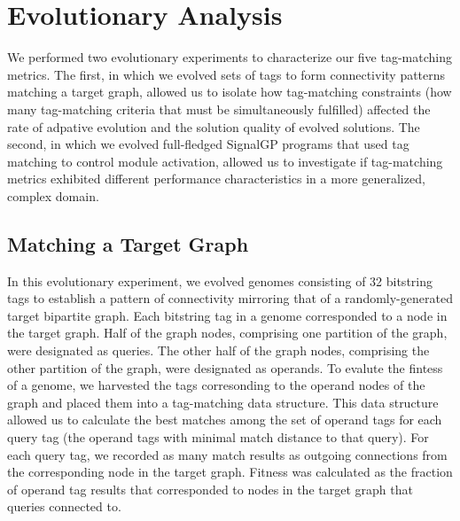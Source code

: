 \section{Evolutionary Analysis}

We performed two evolutionary experiments to characterize our five tag-matching metrics.
The first, in which we evolved sets of tags to form connectivity patterns matching a target graph, allowed us to isolate how tag-matching constraints (how many tag-matching criteria that must be simultaneously fulfilled) affected the rate of adpative evolution and the solution quality of evolved solutions.
The second, in which we evolved full-fledged SignalGP programs that used tag matching to control module activation, allowed us to investigate if tag-matching metrics exhibited different performance characteristics in a more generalized, complex domain.

\subsection{Matching a Target Graph}

In this evolutionary experiment, we evolved genomes consisting of 32 bitstring tags to establish a pattern of connectivity mirroring that of a randomly-generated target bipartite graph.
Each bitstring tag in a genome corresponded to a node in the target graph.
Half of the graph nodes, comprising one partition of the graph, were designated as queries.
The other half of the graph nodes, comprising the other partition of the graph, were designated as operands.
To evalute the fintess of a genome, we harvested the tags corresonding to the operand nodes of the graph and placed them into a tag-matching data structure.
This data structure allowed us to calculate the best matches among the set of operand tags for each query tag (the operand tags with minimal match distance to that query).
For each query tag, we recorded as many match results as outgoing connections from the corresponding node in the target graph.
Fitness was calculated as the fraction of operand tag results that corresponded to nodes in the target graph that queries connected to.

